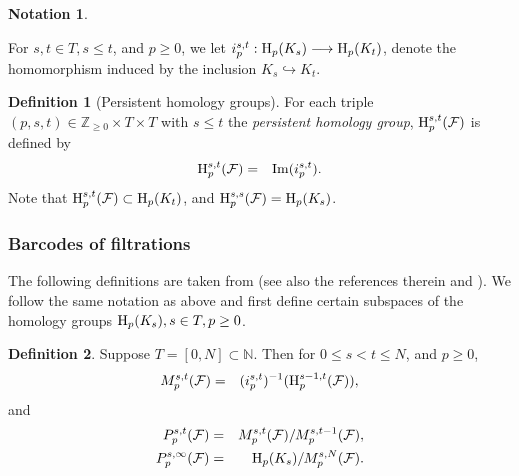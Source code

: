 \documentclass[11pt]{amsart}
\theoremstyle{theorem}
\theoremstyle{remark}
\theoremstyle{definition}
\newtheorem{definition}{Definition}[section]
\newtheorem{notation}{Notation}[section]
\newcommand {\Z}  {\mathbb{Z}}
\newcommand{\HH}  {\mbox{\rm H}}
\begin{document}
\begin{notation}
\label{not:inclusion}

  For $s, t \in T,   s \leq t$, and $p \geq 0$, we let $i_p^{s, t} : \HH_p (K_s) \longrightarrow
  \HH_p (K_t)$, denote the homomorphism induced by the inclusion $K_s
  \hookrightarrow K_t$.
\end{notation}



\begin{definition}[Persistent homology groups]
\label{def:persistent}
 For each triple $(p, s, t)  \in \Z_{\geq 0} \times T  \times T$ with 
$s \leq t$ 
  the   
  \emph{persistent homology  group},       
  $\HH_p^{s, t} (\mathcal{F})$ is defined by
  \begin{eqnarray*}
    \HH_p^{s, t} (\mathcal{F}) & = &  \mathrm{Im} (i_p^{s, t}).
  \end{eqnarray*}
  Note that $\HH_p^{s, t} (\mathcal{F}) \subset \HH_p (K_t)$,    
  and 
  $\HH_p^{s, s}(\mathcal{F}) = \HH_p (K_s)$.
\end{definition}


\subsubsection{Barcodes of filtrations}
The following definitions are taken from \cite{Basu-Karisani} (see also the references therein and \cite[Theorem 1]{Ghrist-Henselman}).
We follow  the same notation as above and first define certain subspaces of the homology
groups $\HH_p(K_s), s \in T, p \geq 0$.




\begin{definition}
\label{def:barcode}
Suppose $T = [0,N] \subset \mathbb{N}$. Then for
$0 \leq s < t \leq N$, 
and $p \geq 0$,
\begin{eqnarray*}
M^{s,t}_p(\mathcal{F}) &=& (i^{s,t}_p)^{-1}(\HH^{s-1,t}_p(\mathcal{F})), 
\end{eqnarray*}
and
\begin{eqnarray*}
P^{s,t}_p(\mathcal{F}) &=& M^{s,t}_p(\mathcal{F})/M^{s,t-1}_p(\mathcal{F}), \\
P^{s,\infty}_p(\mathcal{F}) &=&  
\HH_p(K_s) / M^{s,N}_p(\mathcal{F}).
\end{eqnarray*}
\end{definition}
\end{document}
